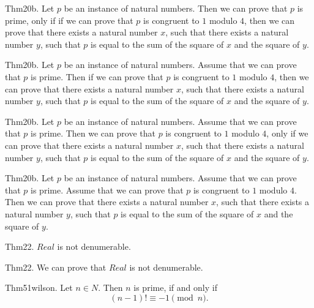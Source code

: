 \documentclass{article}
\begin{document}
Thm20b. Let $p$ be an instance of natural numbers. Then we can prove that $p$ is prime, only if if we can prove that $p$ is congruent to $1$ modulo $4$, then we can prove that there exists a natural number $x$, such that there exists a natural number $y$, such that $p$ is equal to the sum of the square of $x$ and the square of $y$.

Thm20b. Let $p$ be an instance of natural numbers. Assume that we can prove that $p$ is prime. Then if we can prove that $p$ is congruent to $1$ modulo $4$, then we can prove that there exists a natural number $x$, such that there exists a natural number $y$, such that $p$ is equal to the sum of the square of $x$ and the square of $y$.

Thm20b. Let $p$ be an instance of natural numbers. Assume that we can prove that $p$ is prime. Then we can prove that $p$ is congruent to $1$ modulo $4$, only if we can prove that there exists a natural number $x$, such that there exists a natural number $y$, such that $p$ is equal to the sum of the square of $x$ and the square of $y$.

Thm20b. Let $p$ be an instance of natural numbers. Assume that we can prove that $p$ is prime. Assume that we can prove that $p$ is congruent to $1$ modulo $4$. Then we can prove that there exists a natural number $x$, such that there exists a natural number $y$, such that $p$ is equal to the sum of the square of $x$ and the square of $y$.

Thm22. $Real$ is not denumerable.

Thm22. We can prove that $Real$ is not denumerable.

Thm51wilson. Let $n \in N$. Then $n$ is prime, if and only if $$(n - 1)! \equiv - 1 \pmod{ n}.$$
\end{document}

